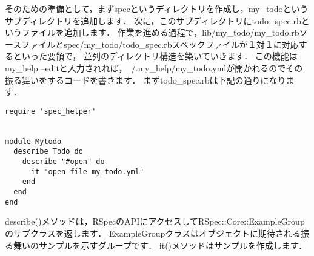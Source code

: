 そのための準備として，まずspecというディレクトリを作成し，my\_todoというサブディレクトリを追加します．
次に，このサブディレクトリにtodo\_spec.rbというファイルを追加します．
作業を進める過程で，lib/my\_todo/my\_todo.rbソースファイルとspec/my\_todo/todo\_spec.rbスペックファイルが１対１に対応するといった要領で，
並列のディレクトリ構造を築いていきます．
この機能はmy\_help --editと入力されれば，~/.my\_help/my\_todo.ymlが開かれるのでその振る舞いをするコードを書きます．
まずtodo\_spec.rbは下記の通りになります．
\begin{lstlisting}[style=customRuby,basicstyle={\scriptsize\ttfamily}]
require 'spec_helper'


module Mytodo
  describe Todo do
    describe "#open" do
      it "open file my_todo.yml" 
    end
  end
end

\end{lstlisting}
describe()メソッドは，RSpecのAPIにアクセスしてRSpec::Core::ExampleGroupのサブクラスを返します．
ExampleGroupクラスはオブジェクトに期待される振る舞いのサンプルを示すグループです．
it()メソッドはサンプルを作成します．

